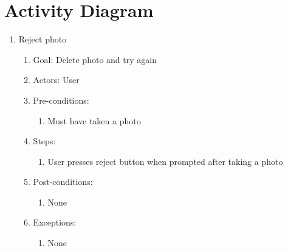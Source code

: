 \chapter{Activity Diagram}

\begin{enumerate}
    \item Reject photo
    \begin{enumerate}
        \item Goal: Delete photo and try again
        \item Actors: User
        \item Pre-conditions:
            \begin{enumerate}
                \item Must have taken a photo
            \end{enumerate}
        \item Steps:
            \begin{enumerate}
                \item User presses reject button when prompted after taking a photo
            \end{enumerate}
        \item Post-conditions:
            \begin{enumerate}
                \item None
            \end{enumerate}
        \item Exceptions:
            \begin{enumerate}
                \item None
            \end{enumerate}
    \end{enumerate}
\end{enumerate}

